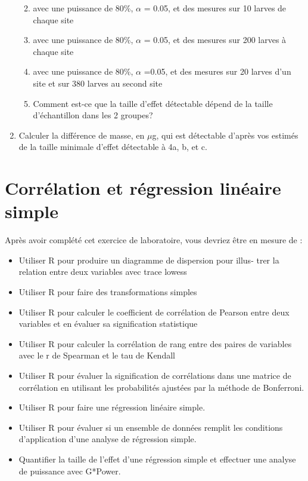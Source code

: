 \documentclass[12pt,]{book}
\providecommand{\tightlist}{%
  \setlength{\itemsep}{0pt}\setlength{\parskip}{0pt}}
\begin{document}
\begin{enumerate}
  \begin{enumerate}
  \def\labelenumii{\alph{enumii})}
  \tightlist
  \item
    avec une puissance de 80\%, \(\alpha\) = 0.05, et des mesures sur 10 larves de chaque site
  \item
    avec une puissance de 80\%, \(\alpha\) = 0.05, et des mesures sur 200 larves à chaque site
  \item
    avec une puissance de 80\%, \(\alpha\) =0.05, et des mesures sur 20 larves d'un site et sur 380 larves au second site
  \item
    Comment est-ce que la taille d'effet détectable dépend de la taille d'échantillon dans les 2 groupes?
  \end{enumerate}
\item
  Calculer la différence de masse, en \(\mu\)g, qui est détectable d'après vos estimés de la taille minimale d'effet détectable à 4a, b, et c.
\end{enumerate}

\hypertarget{corruxe9lation-et-ruxe9gression-linuxe9aire-simple}{%
\chapter{Corrélation et régression linéaire simple}\label{corruxe9lation-et-ruxe9gression-linuxe9aire-simple}}

Après avoir complété cet exercice de laboratoire, vous devriez être en mesure de :

\begin{itemize}
\tightlist
\item
  Utiliser R pour produire un diagramme de dispersion pour illus-
  trer la relation entre deux variables avec trace lowess
\item
  Utiliser R pour faire des transformations simples
\item
  Utiliser R pour calculer le coefficient de corrélation de Pearson entre deux variables et en évaluer sa signification statistique
\item
  Utiliser R pour calculer la corrélation de rang entre des paires de variables avec le r de Spearman et le tau de Kendall
\item
  Utiliser R pour évaluer la signification de corrélations dans une matrice de corrélation en utilisant les probabilités ajustées par la méthode de Bonferroni.
\item
  Utiliser R pour faire une régression linéaire simple.
\item
  Utiliser R pour évaluer si un ensemble de données remplit les conditions d'application d'une analyse de régression simple.
\item
  Quantifier la taille de l'effet d'une régression simple et effectuer une analyse de puissance avec G*Power.
\end{itemize}
\end{document}
